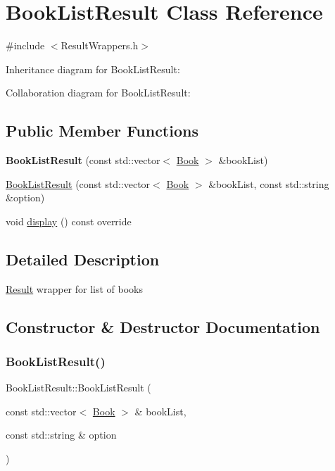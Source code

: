 \hypertarget{classBookListResult}{}\section{Book\+List\+Result Class Reference}
\label{classBookListResult}


{\ttfamily \#include $<$Result\+Wrappers.\+h$>$}



Inheritance diagram for Book\+List\+Result\+:


Collaboration diagram for Book\+List\+Result\+:
\subsection*{Public Member Functions}
\begin{DoxyCompactItemize}
\item 
\mbox{\label{classBookListResult_a1f8184928b58472586b5d12535815e91}} 
{\bfseries Book\+List\+Result} (const std\+::vector$<$ \hyperlink{classBook}{Book} $>$ \&book\+List)
\item 
\hyperlink{classBookListResult_a8c9c16e1b6b61f72271dc0832d4cc7e1}{Book\+List\+Result} (const std\+::vector$<$ \hyperlink{classBook}{Book} $>$ \&book\+List, const std\+::string \&option)
\item 
void \hyperlink{classBookListResult_afecd81f393580cf102e694796d6d3ab7}{display} () const override
\end{DoxyCompactItemize}


\subsection{Detailed Description}
\hyperlink{classResult}{Result} wrapper for list of books 

\subsection{Constructor \& Destructor Documentation}
\mbox{\label{classBookListResult_a8c9c16e1b6b61f72271dc0832d4cc7e1}} 
\subsubsection{\texorpdfstring{Book\+List\+Result()}{BookListResult()}}
{\footnotesize\ttfamily Book\+List\+Result\+::\+Book\+List\+Result (\begin{DoxyParamCaption}\item[{const std\+::vector$<$ \hyperlink{classBook}{Book} $>$ \&}]{book\+List,  }\item[{const std\+::string \&}]{option }\end{DoxyParamCaption})}

